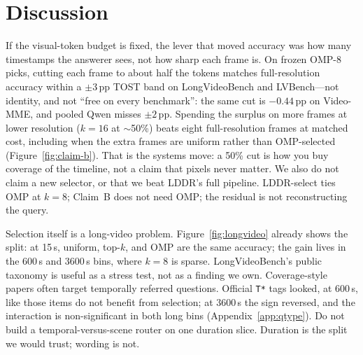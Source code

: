 \documentclass[11pt]{article}
\begin{document}
\begin{table}[t]
\centering
\small
{}
\caption{OMP vs.\ uniform, identical picks and tile budget, InternVL3.
Deltas in percentage points. Video-MME overall: 2B ${+}4.52$, 8B ${+}1.96$.}
\label{tab:internvl}
\end{table}

\section{Discussion}
\label{sec:discussion}

If the visual-token budget is fixed, the lever that moved accuracy was how many timestamps the answerer sees, not how sharp each frame is.
On frozen OMP-8 picks, cutting each frame to about half the tokens matches full-resolution accuracy within a ${\pm}3$\,pp TOST band on LongVideoBench and LVBench---not identity, and not ``free on every benchmark'': the same cut is ${-}0.44$\,pp on Video-MME, and pooled Qwen misses ${\pm}2$\,pp.
Spending the surplus on more frames at lower resolution ($k{=}16$ at ${\sim}$50\%) beats eight full-resolution frames at matched cost, including when the extra frames are uniform rather than OMP-selected (Figure~\ref{fig:claim-b}).
That is the systems move: a 50\% cut is how you buy coverage of the timeline, not a claim that pixels never matter.
We also do not claim a new selector, or that we beat LDDR's full pipeline.
LDDR-select ties OMP at $k{=}8$; Claim~B does not need OMP; the residual is not reconstructing the query.

Selection itself is a long-video problem.
Figure~\ref{fig:longvideo} already shows the split: at 15\,s, uniform, top-$k$, and OMP are the same accuracy; the gain lives in the 600\,s and 3600\,s bins, where $k{=}8$ is sparse.
LongVideoBench's public taxonomy is useful as a stress test, not as a finding we own.
Coverage-style papers often target temporally referred questions.
Official \texttt{T*} tags looked, at 600\,s, like those items do not benefit from selection; at 3600\,s the sign reversed, and the interaction is non-significant in both long bins (Appendix~\ref{app:qtype}).
Do not build a temporal-versus-scene router on one duration slice.
Duration is the split we would trust; wording is not.
\end{document}
